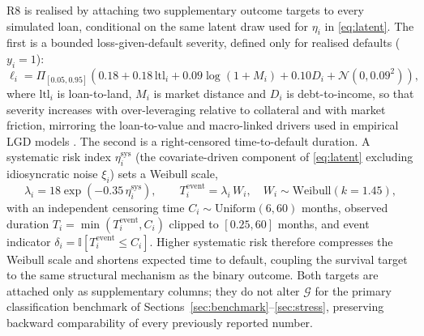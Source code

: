 \documentclass[journal]{IEEEtran}
\newcommand{\dgp}{\ensuremath{\mathcal{G}}}
\begin{document}
R8 is realised by attaching two supplementary outcome targets to every simulated loan, conditional on the same latent draw used for $\eta_i$ in \eqref{eq:latent}. The first is a bounded loss-given-default severity, defined only for realised defaults ($y_i=1$):
\begin{equation}
\ell_i = \Pi_{[0.05,0.95]}\!\left(0.18 + 0.18\,\text{ltl}_i + 0.09\log(1+M_i) + 0.10 D_i + \mathcal{N}(0,0.09^2)\right),
\label{eq:lgd}
\end{equation}
where $\text{ltl}_i$ is loan-to-land, $M_i$ is market distance and $D_i$ is debt-to-income, so that severity increases with over-leveraging relative to collateral and with market friction, mirroring the loan-to-value and macro-linked drivers used in empirical LGD models \cite{smaragdakis2021lgd}. The second is a right-censored time-to-default duration. A systematic risk index $\eta_i^{\text{sys}}$ (the covariate-driven component of \eqref{eq:latent} excluding idiosyncratic noise $\xi_i$) sets a Weibull scale,
\begin{equation}
\lambda_i = 18\exp\!\left(-0.35\,\eta_i^{\text{sys}}\right), \qquad T_i^{\text{event}} = \lambda_i\, W_i,\quad W_i\sim\text{Weibull}(k=1.45),
\label{eq:weibull}
\end{equation}
with an independent censoring time $C_i\sim\text{Uniform}(6,60)$ months, observed duration $T_i=\min(T_i^{\text{event}},C_i)$ clipped to $[0.25,60]$ months, and event indicator $\delta_i=\mathbb{I}[T_i^{\text{event}}\le C_i]$. Higher systematic risk therefore compresses the Weibull scale and shortens expected time to default, coupling the survival target to the same structural mechanism as the binary outcome. Both targets are attached only as supplementary columns; they do not alter $\dgp$ for the primary classification benchmark of Sections~\ref{sec:benchmark}--\ref{sec:stress}, preserving backward comparability of every previously reported number.
\end{document}
